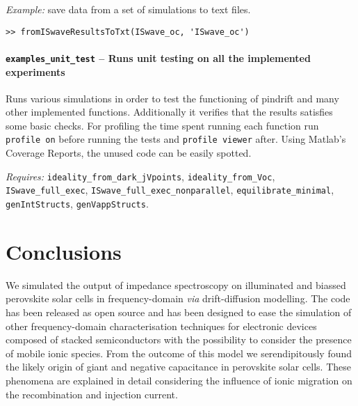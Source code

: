
	\textit{Example:} save data from a set of simulations to text files.
	\begin{lstlisting}[style=Matlab-editor]
>> fromISwaveResultsToTxt(ISwave_oc, 'ISwave_oc')
\end{lstlisting}


	\paragraph{\texttt{examples\_unit\_test} -- Runs unit testing on all the implemented experiments}
	Runs various simulations in order to test the functioning of pindrift and many other implemented functions.
	Additionally it verifies that the results satisfies some basic checks.
	For profiling the time spent running each function run \texttt{profile\- on} before running the tests and \texttt{profile\- viewer} after.
	Using Matlab's Coverage Reports, the unused code can be easily spotted.

	\textit{Requires:} \texttt{ideality\_from\_dark\_jVpoints}, \texttt{ideality\_from\_Voc}, \texttt{IS\-wave\_full\_exec}, \texttt{IS\-wave\_full\_exec\_nonparallel}, \texttt{equilibrate\_minimal}, \texttt{gen\-Int\-Structs}, \texttt{gen\-Vapp\-Structs}.


\section{Conclusions}
	We simulated the output of impedance spectroscopy on illuminated and biassed perovskite solar cells in frequency\hyp{}domain \textsl{via} drift\hyp{}diffusion modelling.
	The code has been released as open source and has been designed to ease the simulation of other frequency\hyp{}domain characterisation techniques for electronic devices composed of stacked semiconductors with the possibility to consider the presence of mobile ionic species.
	From the outcome of this model we serendipitously found the likely origin of giant and negative capacitance in perovskite solar cells.
	These phenomena are explained in detail considering the influence of ionic migration on the recombination and injection current.

